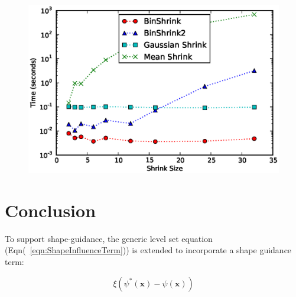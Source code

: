 \documentclass{InsightArticle}
\begin{document}
\begin{figure}
  \centering
  \includegraphics[width=0.8\linewidth]{images/shrink_time}
  \label{fig:ShrinkPerformance}
\end{figure}

\section{Conclusion}







To support shape-guidance, the generic level set equation
(Eqn(~\ref{eqn:ShapeInfluenceTerm})) is extended to incorporate a shape guidance
term:

\begin{equation}
\label{eqn:ShapeInfluenceTerm}
\xi \left(\psi^{*}(\mathbf{x}) - \psi(\mathbf{x})\right)
\end{equation}




%
%



\end{document}
